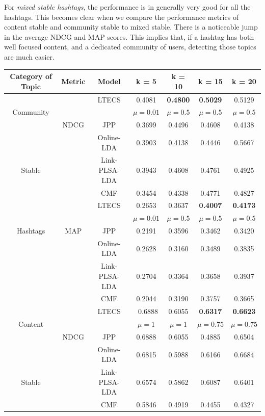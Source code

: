 For \emph{mixed stable hashtags}, the performance is in generally very good for all the hashtags.
This becomes clear when we compare the performance metrics of content stable and community stable to mixed stable.  There
is a noticeable jump in the average NDCG and MAP scores.  This implies that, if a hashtag
has both well focused content, and a dedicated community of users, detecting those topics
are much easier. 
\begin{table}[!t]
\begin{center}
{\small 
{\renewcommand{\arraystretch}{0.91}
\begin{tabular}{||c|c|c|cccc||}
\hline
 Category of Topic &Metric & Model & k = 5 & k = 10 & k = 15 & k = 20\\
\hline
 		    & & LTECS & 0.4081 & \textbf{0.4800} & \textbf{0.5029} & 0.5129\\
Community 	& &  & $\mu =  0.01$  & $\mu = 0.5$ & $\mu =  0.5 $ & $\mu = 0.5$\\ \cline{4-7}	
		    & NDCG & JPP & 0.3699 & 0.4496 & 0.4608 &0.4138\\
			&  & Online-LDA & 0.3903 & 0.4138 &0.4446  & 0.5667 \\
Stable       & & Link-PLSA-LDA &0.3943 & 0.4608 & 0.4761 & 0.4925\\ 
        & & CMF & 0.3454 & 0.4338 & 0.4771 & 0.4827 \\ \cline{4-7}
		& & LTECS & 0.2653 & 0.3637 & \textbf{0.4007} & \textbf{0.4173}  \\
		& &  &$\mu = 0.01$ & $\mu = 0.5 $ & $\mu = 0.5$  & $\mu = 0.5$ \\ \cline{4-7}
Hashtags&MAP & JPP &  0.2191 & 0.3596 & 0.3462 & 0.3420 \\
		& & Online-LDA & 0.2628  & 0.3160 & 0.3489 & 0.3835 \\
		& & Link-PLSA-LDA & 0.2704 & 0.3364  & 0.3658 & 0.3937 \\
        & & CMF & 0.2044 & 0.3190 & 0.3757 & 0.3665 \\
\hline
		& & LTECS &\ 0.6888 & 0.6055& \textbf{0.6317}& \textbf{0.6623} \\
Content   & &  & $\mu =  1$  & $\mu = 1$ & $\mu =  0.75 $ & $\mu = 0.75$\\ \cline{4-7}
		&NDCG & JPP & 0.6888 & 0.6055 &  0.4885&  0.6504 \\
		& & Online-LDA & 0.6815& 0.5988 & 0.6166 & 0.6684  \\
Stable  & & Link-PLSA-LDA & 0.6574 & 0.5862 & 0.6087& 0.6401\\ 
        & & CMF & 0.5846 & 0.4919 & 0.4455 & 0.4327 \\\cline{2-7}

\end{tabular}}}
\end{center}
\end{table}
